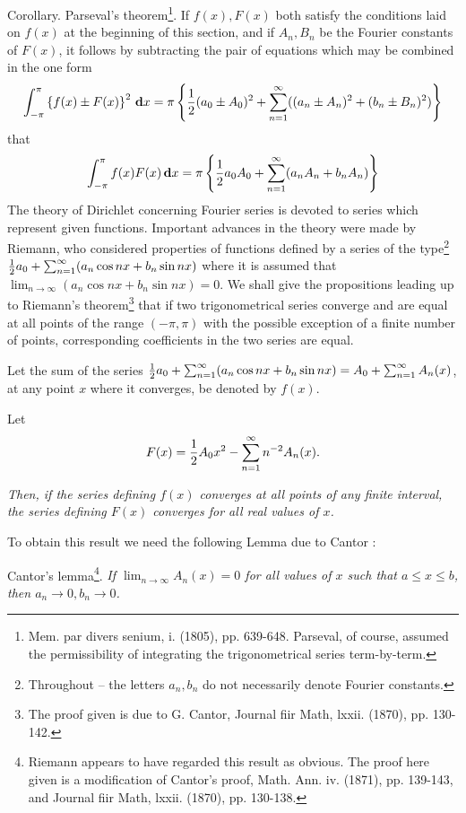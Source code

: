 Corollary. Parseval's theorem\footnote{Mem. par divers senium, i. (1805), pp. 639-648.%
  Parseval, of course, assumed the permissibility of integrating the trigonometrical series
  term-by-term.}. If $f(x), F(x)$ both satisfy the
conditions laid on $f(x)$ at the beginning of this section, and if
$A_{n}, B_{n}$ be the Fourier constants of $F(x)$, it follows by subtracting the pair
of equations which may be combined in the one form
$$
\int_{-\pi}^{\pi}
\left\{ 
  f(x) \pm F(x)
 \right\}^{2}
\, \mathbf{d} x
=
\pi
\left\{ 
  \frac{1}{2} (a_{0} \pm A_{0})^{2}
  +
  \sum_{n=1}^{\infty}
  ((a_{n} \pm A_{n})^{2}
  +
  (b_{n} \pm B_{n})^{2})
 \right\}
$$
that
$$
\int_{-\pi}^{\pi}
f(x)F(x)
\, \mathbf{d} x
=
\pi
\left\{ 
  \frac{1}{2} a_{0}A_{0}
  +
  \sum_{n=1}^{\infty}
  (a_{n}A_{n} + b_{n}A_{n})
 \right\}
$$
The theory of Dirichlet concerning Fourier series is devoted to series
which represent given functions. Important advances in the theory were
made by Riemann, who considered properties of functions defined by a
series of the type\footnote{Throughout -- %
  the letters $a_{n}, b_{n}$ do not necessarily denote Fourier constants.}
$\frac{1}{2} a_{0} + \sum_{n=1}^{\infty} (a_{n} \cos nx + b_{n} \sin nx)$
where it is assumed that
$\lim_{n \rightarrow \infty} (a_{n} \cos nx + b_{n} \sin nx) = 0$.
We shall give the propositions leading
up to Riemann's theorem\footnote{The proof given is due to G. Cantor, Journal fiir
  Math, lxxii. (1870), pp. 130-142.} %
that if two trigonometrical series converge and
are equal
%
%
at all points of the range $(-\pi, \pi)$ with the possible exception of a
finite number of points, corresponding coefficients in the two series
are equal.

Let the sum of the series
$\frac{1}{2} a_{0} + \sum_{n=1}^{\infty} (a_{n} \cos nx + b_{n} \sin nx)
=
A_{0} + \sum_{n=1}^{\infty} A_{n}(x)$,
at any point $x$ where it converges, be denoted by $f(x)$.

Let
$$
F(x) = \frac{1}{2} A_{0} x^{2} - \sum_{n=1}^{\infty} n^{-2} A_{n}(x).
$$

\emph{Then, if the series defining $f(x)$ converges at all points of any
finite interval, the series defining $F(x)$ converges for all real
values of $x$.}

To obtain this result we need the following Lemma due to Cantor :

Cantor's lemma\footnote{Riemann appears to have regarded this result as obvious.
  The proof here given is a modification of Cantor's proof,
  Math. Ann. iv. (1871), pp. 139-143, and Journal fiir Math, lxxii. (1870), pp. 130-138.}.%
\emph{If $\lim_{n \rightarrow \infty} A_{n}(x) = 0$ for all values of $x$ such that $a \leq x \leq b$,
then $a_{n} \rightarrow 0, b_{n} \rightarrow 0$.
}

